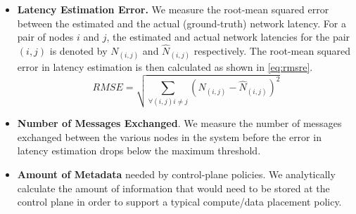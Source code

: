 \begin{itemize}
\item \textbf{Latency Estimation Error.} We measure the root-mean squared error between the estimated and the actual (ground-truth) network latency. For a pair of nodes $i$ and $j$, the estimated and actual network latencies for the pair $\left( i, j\right)$ is denoted by $N_{\left( i, j\right)}$ and $\hat{N}_{\left( i, j\right)}$ respectively. The root-mean squared error in latency estimation is then calculated as shown in \cref{eq:rmsre}.
\begin{equation}
\label{eq:rmsre}
RMSE = \sqrt{\sum_{\forall \left(i, j \right) i \neq j}{\left(N_{\left( i, j\right)} - \hat{N}_{\left( i, j\right)}\right)^2}}
\end{equation}
\item \textbf{Number of Messages Exchanged}. We measure the number of messages exchanged between the various nodes in the system before the error in latency estimation drops below the maximum threshold.
\item \textbf{Amount of Metadata} needed by control-plane policies. We analytically calculate the amount of information that would need to be stored at the control plane in order to support a typical compute/data placement policy.
\end{itemize}

